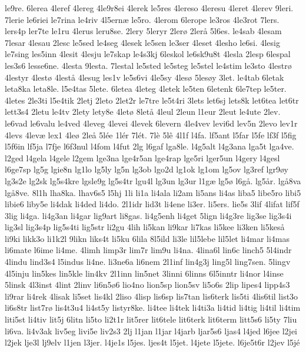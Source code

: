 {le9re.
6lerea
4leref
4lereg
4le9r8ei
4lerek
le5res
4lereso
4leresu
4leret
4lerev
9leri.
7lerie
le6riei
le7rina
le4riv
4l5ernæ
le5ro.
4lerom
6lerope
le3ros
4le3rot
7lers.
lers4p
ler7te
le1ru
4lerus
leru8se.
2lery
5leryr
2lerø
2lerå
5l6es.
le4sab
4lesam
7lesar
4lesau
2lesc
le5sed
le4seg
4lesek
le5sen
le3ser
4leset
4lesho
le6si.
4lesig
le7sing
les5inn
4lesit
4lesju
le7skap
le4s3kj
6leskol
le6sk9u8t
4lesla
2lesp
6lespal
les3s6
lesse6ne.
4lesta
9lesta.
7lestal
le5sted
le5steg
le5stel
le4stim
le3sto
4lestrø
4lestyr
4lestø
4lestå
4lesug
les1v
le5s6vi
4le5sy
4lesø
5lesøy
3let.
le4tab
6letak
leta8ka
leta8le.
l5e4tas
5lete.
6letea
4leteg
4letek
le5ten
6letenk
6le7tep
le5ter.
4letes
2le3ti
l5e4tik
2letj
2leto
2let2r
le7tre
le5t4ri
3lets
let6sj
lets8k
let6tea
let6tr
lett3s4
2letu
le4tv
2lety
lety8e
4letø
8letå
4leul
2leun
l1eur
2leut
le4ute
2lev.
le6vad
le6valu
le4ved
4leveg
4levei
4levek
6levern
4le4vev
levi6d
lev5n
2levo
lev1r
4levs
4levæ
lex1
4leø
2leå
5lée
1lér
7lét.
7lè
5lê
4l1f
l4fa.
lf5ant
l5far
l5fe
lf3f
l5fig
l5f6in
lf5ja
l7fje
l6f3nul
l4fom
l4fut
2lg
l6gaf
lga8le.
l4g5alt
l4g3ana
lga5t
lga4ve.
l2ged
l4gela
l4gele
l2gem
lge3na
lge4r5an
lge4rap
lge5ri
lger5un
l4gery
l4gesl
l6ge7sp
lg5g
lgie8n
lg1lo
lg5ly
lg5n
lg3ob
lgo2d
lg1ok
lg1om
lg5ov
lg3ref
lgr9øy
lg3s2e
lg2sk
lg5s4kre
lgsle9g
lg5s4tr
lgu4l
lg3un
lg3ur
l1gæ
lg5ø
l6gå.
lg5år.
lgå8va
lgå8ve.
8l1h
lha8ka.
lhav6s5
l5hj
1li
li1a
li4ala
li2am
li5ans
li4as
liba5
libe5ro
libi5
libie6
liby5e
li4dak
li4ded
li4do.
2l1idr
lid3t
li4ene
li3er.
li5ers.
lie5s
3lif
4lifat
lif5f
3lig
li4ga.
li4g3an
li4gar
lig9art
li8gas.
li4g5enh
li4get
5lign
li4g3re
lig3se
lig3s4i
lig3sl
lig3s4p
lig5s4ti
lig5str
li2gu
4lih
li5kan
li9kar
li7kas
li5kee
li3ken
li5keså
li9ki
likk3o
li1k2l
9likn
liks4t
li5ku
6lila
8l5ild
li3le
lil5lebe
lil5let
li4mar
li4mas
li6mate
l6ime
li4me.
4limh
limp3r
lim7r
lim9u
li4na.
4lina6l
lin6c
linch5
5l4indr
4lindu
lind3s4
l5indus
li4ne.
li3ne6a
li6nem
2l1inf
lin4g3j
ling5l
ling7sen.
5lingv
4l5inju
lin5kes
lin5kle
lin4kv
2l1inn
lin5net
3linni
6linns
6l5inntr
li4nor
l4inse
5linsk
4l3inst
4lint
2linv
li6n5ø6
lio4no
lion5sp
lion5sv
li5o6s
2lip
lipes4
lipp4s3
li9rar
li4rek
4lisak
li5set
lis4kl
2liso
4lisp
lis6sp
lis7tan
lis6terk
lis5ti
4lis6til
list3o
li6s8tr
list7rø
lis4t3u4
li4st5y
listyr8ke.
li4tee
li4tek
li4ti3a
li4tid
li4tig
li4til
li4tim
liti5st
li4tiv
lit5j
6litn
li5to
li2t1r
lit5rer
lit6tele
lit6terk
lit6term
litt5s6
li5ty
7liu
li6va.
li4v3ak
liv5eg
livi5e
liv2s3
2lj
l1jan
l1jar
l4jarb
ljar5s6
ljas4
l4jed
l6jee
l2jei
l2jek
lje3l
lj9elv
l1jen
l3jer.
l4je1s
l5jes.
ljes4t
l5jet.
l4jete
l5jete.
l6je5t6r
l2jev
l5jé
}
